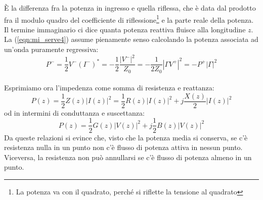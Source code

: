 \documentclass{book}
\begin{document}
        È la differenza fra la potenza in ingresso e quella riflessa, che è data dal prodotto fra il modulo quadro 
        del coefficiente di riflessione\footnote{La potenza va con il quadrato, perché si riflette la tensione al quadrato} e
        la parte reale della potenza.
        Il termine immaginario ci dice quanta potenza reattiva fluisce alla longitudine $z$. \\
        La (\ref{eqn:mi_serve4}) assume pienamente senso calcolando la potenza associata ad un'onda puramente regressiva:
        \begin{equation}
            P^{-}=\frac{1}{2}V^{-}(I^{-})^{*}=-\frac{1}{2}\frac{|V^{-}|^{2}}{Z_{0}} = 
            -\frac{1}{2Z_{0}}|\Gamma V^{+}|^{2} = - P^{+}|\Gamma|^{2}
        \end{equation}
        \\ Esprimiamo ora l'impedenza come somma di resistenza e reattanza:
        \begin{equation}
            P(z)=\frac{1}{2}Z(z)|I(z)|^{2} = \frac{1}{2}R(z)|I(z)|^{2}+j\frac{X(z)}{2}|I(z)|^{2}
        \end{equation}
        od in intermini di conduttanza e suscettanza:
        \begin{equation}
            P(z)=\frac{1}{2}G(z)|V(z)|^{2}+j\frac{1}{2}B(z)|V(z)|^{2}
        \end{equation}
        Da queste relazioni si evince che, visto che la potenza media si conserva, se c'è resistenza nulla in un punto non c'è flusso 
        di potenza attiva in nessun punto. Viceversa, la resistenza non può annullarsi se c'è flusso di potenza almeno in un punto.
\end{document}
